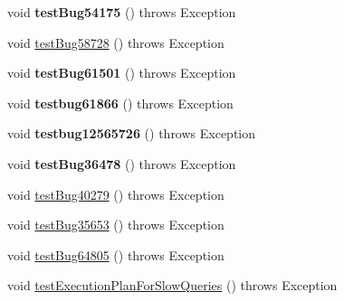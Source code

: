\begin{DoxyCompactItemize}
\item 
\mbox{\label{classtestsuite_1_1regression_1_1_statement_regression_test_a58e585594c886a2bc7d1179b9be2d1c2}} 
void {\bfseries test\+Bug54175} ()  throws Exception 
\item 
void \mbox{\hyperlink{classtestsuite_1_1regression_1_1_statement_regression_test_a84dc5a1748d9651df8f09ae7b8e2fd2b}{test\+Bug58728}} ()  throws Exception 
\item 
\mbox{\label{classtestsuite_1_1regression_1_1_statement_regression_test_a9a35d52eb464cf7089e61c04944d9c4d}} 
void {\bfseries test\+Bug61501} ()  throws Exception 
\item 
\mbox{\label{classtestsuite_1_1regression_1_1_statement_regression_test_a8cccba0c2f85f3a64228f15cb1973073}} 
void {\bfseries testbug61866} ()  throws Exception 
\item 
\mbox{\label{classtestsuite_1_1regression_1_1_statement_regression_test_a7c42f31415085e3dc5b8531b4f5b1a6d}} 
void {\bfseries testbug12565726} ()  throws Exception 
\item 
\mbox{\label{classtestsuite_1_1regression_1_1_statement_regression_test_a683128ef39eee9bd631d50121aa58fc8}} 
void {\bfseries test\+Bug36478} ()  throws Exception 
\item 
void \mbox{\hyperlink{classtestsuite_1_1regression_1_1_statement_regression_test_adcee0bfb85026b28841f5a0cd08125a2}{test\+Bug40279}} ()  throws Exception 
\item 
void \mbox{\hyperlink{classtestsuite_1_1regression_1_1_statement_regression_test_a40b2d7e9258863dc6ad385628b08e04d}{test\+Bug35653}} ()  throws Exception 
\item 
void \mbox{\hyperlink{classtestsuite_1_1regression_1_1_statement_regression_test_af54f8dc05c901b420749b5525d6b1db9}{test\+Bug64805}} ()  throws Exception 
\item 
void \mbox{\hyperlink{classtestsuite_1_1regression_1_1_statement_regression_test_a48e3f759b34396e94ab7bf59872d5604}{test\+Execution\+Plan\+For\+Slow\+Queries}} ()  throws Exception 

\end{DoxyCompactItemize}
